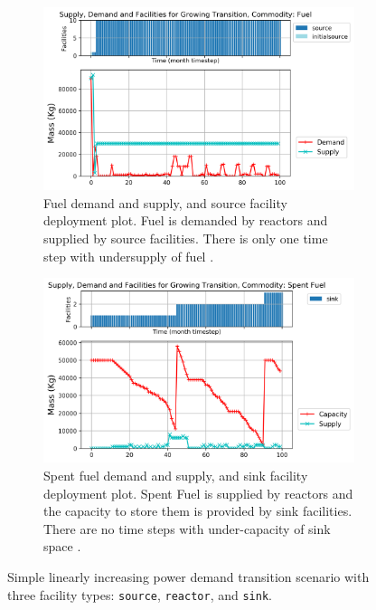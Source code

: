     \begin{figure}[]
        \centering
        \begin{subfigure}[t]{\textwidth}
            \centering
            \includegraphics[width=0.9\linewidth]{figures/growingtransition-fuel.png} 
            \caption{Fuel demand and supply, and source facility deployment plot.
            Fuel is demanded by reactors and supplied by source facilities.
            There is only one time step with undersupply of fuel \cite{chee_arfc/transition-scenarios_2018}.}
            \label{fig:growingtransition-fuel}
        \end{subfigure}
        \begin{subfigure}[t]{\textwidth}
            \centering
            \includegraphics[width=0.9\linewidth]{figures/growingtransition-spentfuel.png} 
            \caption{Spent fuel demand and supply, and sink facility deployment plot.
                Spent Fuel is supplied by reactors and the capacity to store them 
                is provided by sink facilities.
            There are no time steps with under-capacity of sink space \cite{chee_arfc/transition-scenarios_2018}.}
            \label{fig:growingtransition-spentfuel}
        \end{subfigure}
        \caption{Simple linearly increasing power demand transition scenario with 
        three facility types: \texttt{source}, \texttt{reactor}, and \texttt{sink}.}
    \end{figure}
    
